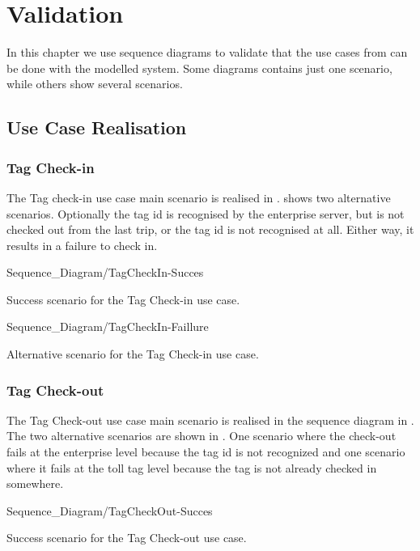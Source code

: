 \chapter{Validation}
In this chapter we use sequence diagrams to validate that the use cases from  can be done with the modelled system. Some diagrams contains just one scenario, while others show several scenarios.

\section{Use Case Realisation}

\subsection{Tag Check-in}
\madeby{\mt}{\jb}
The Tag check-in use case main scenario is realised in .  shows two alternative scenarios. Optionally the tag id is recognised by the enterprise server, but is not checked out from the last trip, or the tag id is not recognised at all. Either way, it results in a failure to check in.

\begin{mylandscapefigure}{Sequence_Diagram/TagCheckIn-Succes}
\caption{Success scenario for the Tag Check-in use case. \madeby{\mt}{\jb}}
\label{fig:tag-in-success}
\end{mylandscapefigure}

\begin{mylandscapefigure}{Sequence_Diagram/TagCheckIn-Faillure}
\caption{Alternative scenario for the Tag Check-in use case. \madeby{\mt}{\jb}}
\label{fig:tag-in-fail}
\end{mylandscapefigure}



\subsection{Tag Check-out}
\madeby{\mb}{\af}
The Tag Check-out use case main scenario is realised in the sequence diagram in . The two alternative scenarios are shown in . One scenario where the check-out fails at the enterprise level because the tag id is not recognized and one scenario where it fails at the toll tag level because the tag is not already checked in somewhere.
\begin{mylandscapefigure}{Sequence_Diagram/TagCheckOut-Succes}
\caption{Success scenario for the Tag Check-out use case. \madeby{\mb}{\af}}
\label{fig:tag-out-success}
\end{mylandscapefigure}

